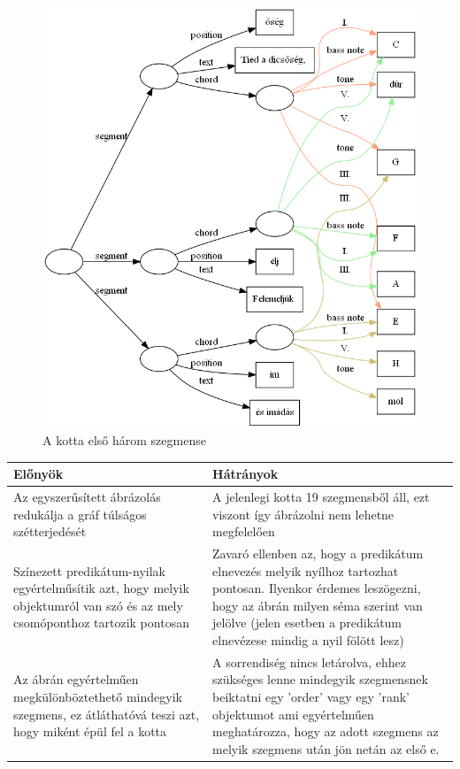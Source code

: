 \begin{figure}[h]
	\includegraphics[scale=0.45]{images/img_src/representation_of_sheet.png}
	\caption{A kotta első három szegmense}
	\label{fig:repres1}
\end{figure}
\newpage
{}
\begin{center}
	\begin{tabular}{ |p{7cm}|p{7cm}| }
		\hline
		Előnyök 
		& 
		Hátrányok
		\\
		\hline
		Az egyszerűsített ábrázolás redukálja a gráf túlságos szétterjedését 
		& 
		A jelenlegi kotta 19 szegmensből áll, ezt viszont így ábrázolni nem lehetne megfelelően 
		\\ 
		\hline
		Színezett predikátum-nyilak egyértelműsítik azt, hogy melyik objektumról van szó és az mely csomóponthoz tartozik pontosan
		& 
		Zavaró ellenben az, hogy a predikátum elnevezés melyik nyílhoz tartozhat pontosan. Ilyenkor érdemes leszögezni, hogy az ábrán milyen séma szerint van jelölve (jelen esetben a predikátum elnevézese mindig a nyil fölött lesz)
		\\ 
		\hline
		Az ábrán egyértelműen megkülönböztethető mindegyik szegmens, ez átláthatóvá teszi azt, hogy miként épül fel a kotta
		& 
		A sorrendiség nincs letárolva, ehhez szükséges lenne mindegyik szegmensnek beiktatni egy 'order' vagy egy 'rank' objektumot ami egyértelműen meghatározza, hogy az adott szegmens az melyik szegmens után jön netán az első e.
		\\ 
		\hline
	\end{tabular}
\end{center}

